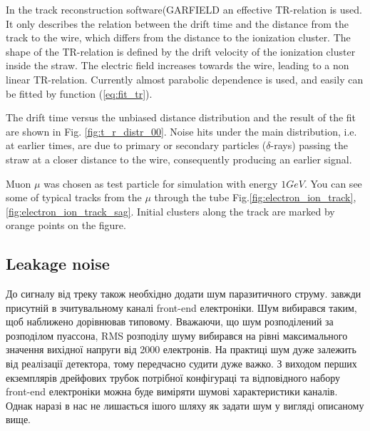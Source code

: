 \documentclass[]{article}
\begin{document}
	In the track reconstruction software(GARFIELD \cite{garfield} an effective TR-relation is used. It only describes the relation between the drift time and the distance from the track to the wire, which differs from the distance to the ionization cluster. The shape of the TR-relation is defined by the drift velocity of the ionization cluster inside the straw. The electric field increases towards the wire, leading to a non linear TR-relation. Currently almost parabolic dependence is used, and easily can be fitted by function (\ref{eq:fit_tr}).

	The drift time versus the unbiased distance distribution and the result of the fit are shown in Fig. \ref{fig:t_r_distr_00}. Noise hits under the main distribution, i.e. at earlier times, are due to primary or secondary particles ($\delta$-rays) passing the straw at a closer distance to the wire, consequently producing an earlier signal.
	
	Muon $\mu$ was chosen as test particle for simulation with energy $1GeV$. You can see some of typical tracks from the $\mu$ through the tube Fig.\ref{fig:electron_ion_track},\ref{fig:electron_ion_track_sag}. Initial clusters along the track are marked by orange points on the figure.
		
	
	\subsection{ Leakage noise}
	
		
	
	До сигналу від треку також необхідно додати шум паразитичного струму. завжди присутній в зчитувальному каналі front-end електроніки. Шум вибирався таким, щоб наближено дорівнював типовому. Вважаючи, що шум розподілений за розподілом пуассона, RMS розподілу шуму вибирався на рівні максимального значення вихідної напруги від 2000 електронів. На практиці шум дуже залежить від реалізації детектора, тому передчасно судити дуже важко. З виходом перших екземплярів дрейфових трубок потрібної конфігураці та відповідного набору front-end електроніки можна буде виміряти шумові характеристики каналів. Однак наразі в нас не лишається ішого шляху як задати шум у вигляді описаному вище.
	 
\end{document}

